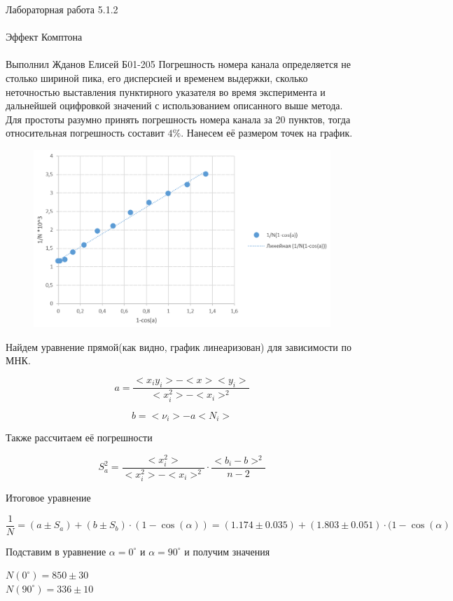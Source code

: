 \documentclass{astroedu-lab}
\begin{document}
\begin{problem}{\huge Лабораторная работа 5.1.2\\\\Эффект Комптона\\\\Выполнил Жданов Елисей Б01-205}
Погрешность номера канала определяется не столько шириной пика, его дисперсией и временем выдержки, сколько неточностью выставления пунктирного указателя во время эксперимента и дальнейшей оцифровкой значений с использованием описанного выше метода. Для простоты разумно принять погрешность номера канала за 20 пунктов, тогда относительная погрешность составит $4\%$. Нанесем её размером точек на график.
\\
\begin{figure}[!h]
	\centering
	\includegraphics[width=1\textwidth]{граф.png}
	\label{fig:boiler}
\end{figure}

Найдем уравнение прямой(как видно, график линеаризован) для зависимости по МНК.

\[
	a = \frac{<x_i y_i> - < x > < y_i >}{< x_i^2> - < x_i >^2}
\]

\[
	b = < \nu_i > - a < N_i >
\]

Также рассчитаем её погрешности

\begin{equation}
	S_a^2 = \frac{< x_i^2>}{< x_i^2 > - < x_i >^2} \cdot \frac{<  b_i - b > ^2}{n - 2}
\end{equation}

Итоговое уравнение

\begin{equation}
	\frac{1}{N} = (a \pm S_a) + (b \pm S_b) \cdot (1 - \cos (\alpha)) = (1.174 \pm 0.035) + (1.803 \pm 0.051) \cdot (1 - \cos (\alpha)
\end{equation}

Подставим в уравнение $\alpha = 0 ^\circ$ и $\alpha = 90 ^\circ$ и получим значения

\begin{center}
	$N ( 0 ^\circ) = 850 \pm 30$\\
	$N ( 90 ^\circ) = 336 \pm 10$
\end{center}


\end{problem}
\end{document}
